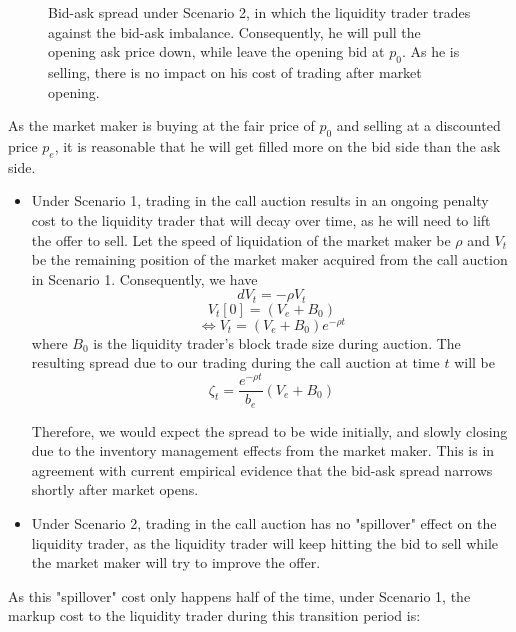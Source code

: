 \documentclass{article}
\begin{document}
\begin{itemize}
{\begin{figure}[h]
          \caption{Bid-ask spread under Scenario 2, in which the liquidity trader trades against the bid-ask imbalance. Consequently, he will pull the opening ask price down, while leave the opening bid at $p_0$. As he is selling, there is no impact on his cost of trading after market opening.}
          \label{fig:mm_pricing_transition_s2}
        \end{figure}
        }
\end{itemize}
As the market maker is buying at the fair price of $p_0$ and selling at a discounted price $p_e$, it is reasonable that he will get filled more on the bid side than the ask side.

\begin{itemize}
  \item Under Scenario 1, trading in the call auction results in an ongoing penalty cost to the liquidity trader that will decay over time, as he will need to lift the offer to sell. Let the speed of liquidation of the market maker be $\rho$ and $V_t$ be the remaining position of the market maker acquired from the call auction in Scenario 1. Consequently, we have
        \[
          dV_t = -\rho V_t
        \]
        \[
          V_t[0]=(V_e + B_0)
        \]
        \begin{equation}\label{eqn:recovery_term_eqb}
          \Leftrightarrow V_t = (V_e + B_0) e^{-\rho t}
        \end{equation}
        where $B_0$ is the liquidity trader's block trade size during auction. The resulting spread due to our trading during the call auction at time $t$ will be
        \begin{equation}\label{resilence_term}
          \zeta_t = \frac{e^{-\rho t}}{b_e}  (V_e + B_0)
        \end{equation}

        Therefore, we would expect the spread to be wide initially, and slowly closing due to the inventory management effects from the market maker. This is in agreement with current empirical evidence that the bid-ask spread narrows shortly after market opens.
  \item Under Scenario 2, trading in the call auction has no "spillover" effect on the liquidity trader, as the liquidity trader will keep hitting the bid to sell while the market maker will try to improve the offer.
\end{itemize}

As this "spillover" cost only happens half of the time, under Scenario 1, the markup cost to the liquidity trader during this transition period is:
\end{document}
